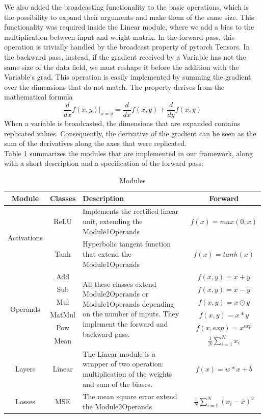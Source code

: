 \documentclass[10pt,conference,compsocconf]{IEEEtran}
\begin{document}
We also added the broadcasting functionality to the basic operations, which is the possibility to expand their arguments and make them of the same size. This functionality was required inside the Linear module, where we add a bias to the multiplication between input and weight matrix.
In the forward pass, this operation is trivially handled by the broadcast property of pytorch Tensors. In the backward pass, instead, if the gradient received by a Variable has not the same size of the data field, we must reshape it before the addition with the Variable's grad. This operation is easily implemented by summing the gradient over the dimensions that do not match. The property derives from the mathematical formula
\[\frac{d}{dx}f(x,y)|_{x=y} = \frac{d}{dx}f(x,y) + \frac{d}{dy}f(x,y)\]
When a variable is broadcasted, the dimensions that are expanded contains replicated values. Consequently, the derivative of the gradient can be seen as the sum of the derivatives along the axes that were replicated.\\

Table \ref{tab:modules} summarizes the modules that are implemented in our framework, along with a short description and a specification of the forward pass:

\begin{table}
\caption{Modules}
\label{tab:modules}
\begin{tabular}{ | c | c | p{10cm} | c | } 
\hline
Module & Classes & Description & Forward  \\
\hline
\multirow{2}{4em}{Activations} 
& ReLU & Implements the rectified linear unit, extending the Module1Operands & $f(x) = max(0, x)$  \\
& Tanh & Hyperbolic tangent function that extend the Module1Operands & $f(x) = tanh(x)$ \\
\hline
\multirow{6}{4em}{Operands}
& Add & \multirow{6}{30em}{All these classes extend Module2Operands or Module1Operands depending on the number of inputs. They implement the forward and backward pass. } & $f(x, y) = x + y$ \\
& Sub & & $f(x, y) = x - y$ \\ 
& Mul & & $f(x, y) = x \odot y$ \\ 
& MatMul & & $f(x, y) = x * y$ \\ 
& Pow & & $f(x, exp) = x^{exp}$ \\ 
& Mean & & $\frac{1}{N} \sum_{i=1}^N x_i$ \\
\hline
Layers & Linear & The Linear module is a wrapper of two operation: multiplication of the weights and sum of the biases. & $f(x) = w*x + b$ \\ 
\hline
Losses & MSE & The mean square error extend the Module2Operands & $\frac{1}{N} \sum_{i=1}^N (x_i - \overline{x})^2$  \\ 
\hline
\end{tabular}
\end{table}
\end{document}
